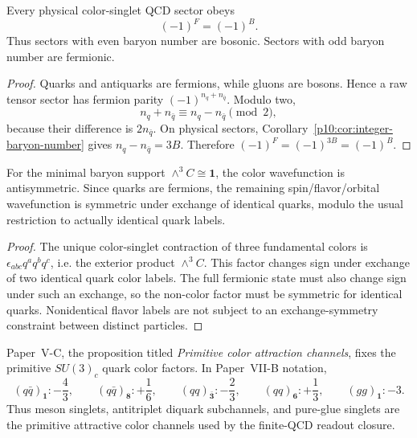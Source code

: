 \documentclass[12pt,a4paper]{article}
\begin{document}
\begin{theorem}
\label{p11:thm:hadronic-fermion-parity}
Every physical color-singlet QCD sector obeys
\begin{equation}
\label{p11:eq:fermion-parity-baryon-parity}
(-1)^F=(-1)^B.
\end{equation}
Thus sectors with even baryon number are bosonic.  Sectors with odd baryon
number are fermionic.
\end{theorem}
\begin{proof}
Quarks and antiquarks are fermions, while gluons are bosons.  Hence a raw tensor sector has fermion parity \((-1)^{n_q+n_{\bar q}}\).  Modulo two,
\begin{equation}
 n_q+n_{\bar q}\equiv n_q-n_{\bar q}\pmod2,
\end{equation}
because their difference is \(2n_{\bar q}\).  On physical sectors, Corollary~\ref{p10:cor:integer-baryon-number} gives \(n_q-n_{\bar q}=3B\).  Therefore \((-1)^F=(-1)^{3B}=(-1)^B\).\qedhere
\end{proof}

\begin{corollary}
\label{p11:cor:minimal-baryon-exchange-symmetry}
For the minimal baryon support \(\wedge^3C\cong\mathbf1\), the color wavefunction is antisymmetric.  Since quarks are fermions, the remaining spin/flavor/orbital wavefunction is symmetric under exchange of identical quarks, modulo the usual restriction to actually identical quark labels.
\end{corollary}
\begin{proof}
The unique color-singlet contraction of three fundamental colors is
\(\epsilon_{abc}q^aq^bq^c\), i.e. the exterior product \(\wedge^3C\).  This
factor changes sign under exchange of two identical quark color labels.  The
full fermionic state must also change sign under such an exchange, so the
non-color factor must be symmetric for identical quarks.  Nonidentical flavor
labels are not subject to an exchange-symmetry constraint between distinct
particles.
\end{proof}


\begin{theorem}
\label{p11:thm:color-casimir-attraction-channels}
Paper~V-C, the proposition titled \emph{Primitive color attraction channels}, fixes the
primitive \(SU(3)_c\) quark color factors.  In Paper~VII-B notation,
\begin{equation}
\label{p11:eq:casimir-attractive-channels}
(q\bar q)_{\mathbf1}:-\frac43,
\qquad
(q\bar q)_{\mathbf8}:+\frac16,
\qquad
(qq)_{\bar{\mathbf3}}:-\frac23,
\qquad
(qq)_{\mathbf6}:+\frac13,
\qquad
(gg)_{\mathbf1}:-3 .
\end{equation}
Thus meson singlets, antitriplet diquark subchannels, and pure-glue singlets
are the primitive attractive color channels used by the finite-QCD readout closure.
\end{theorem}
\end{document}
